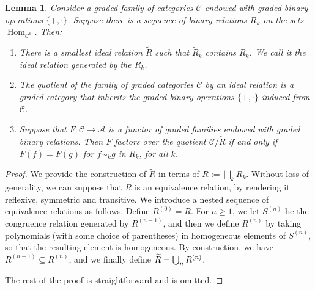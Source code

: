 \documentclass[11pt]{article}
\theoremstyle{plain}
\newtheorem{lemma}[theorem]{Lemma}
\theoremstyle{definition}
\newcommand{\Acal}{\mathcal A}
\newcommand{\Ccal}{\mathcal C}
\DeclareMathOperator{\Hom}{Hom}
\begin{document}
\begin{lemma}\label{lemma:ideal-relation}
Consider a graded family of categories $\Ccal$ endowed with graded binary operations $\{+, \cdot \}$. Suppose there is a sequence of binary relations $R_{k}$ on the sets $\Hom_{\Ccal^k}$. Then:
\begin{enumerate}
\item\label{lemma:ideal-relation-1} There is a smallest ideal relation $\widetilde{R}$ such that $\widetilde{R}_{k}$ contains $R_{k}$. We call it the ideal relation generated by the $R_k$.
\item\label{lemma:ideal-relation-2} The quotient of the family of graded categories $\Ccal$ by an ideal relation is a graded category that inherits the graded binary operations $\{+,\cdot \}$ induced from $\Ccal$.
\item\label{lemma:ideal-relation-3} Suppose that $F: \Ccal \to \Acal$ is a functor of graded families endowed with graded binary relations. Then $F$ factors over the quotient $\Ccal/\widetilde{R}$ if and only if $F(f)=F(g)$ for $f \sim_k g$ in $R_{k}$, for all $k$.
\end{enumerate}
\end{lemma}
\begin{proof}
We provide the construction of $\widetilde{R}$ in terms of $R:=\bigsqcup_{k}R_{k}$. Without loss of generality, we can suppose that $R$ is an equivalence relation, by rendering it reflexive, symmetric and transitive. We introduce a nested sequence of equivalence relations as follows. Define $R^{(0)}=R$. For $n\geq 1$, we let $S^{(n)}$ be the congruence relation generated by $R^{(n-1)}$, and then we define $R^{(n)}$ by taking polynomials (with some choice of parentheses) in homogeneous elements of $S^{(n)}$, so that the resulting element is homogeneous. By construction, we have $R^{(n-1)}\subseteq R^{(n)}$, and we finally define $\widetilde{R}=\nobreak\bigcup_{n}R^{(n)}$.

The rest of the proof is straightforward and is omitted.
\end{proof}
\end{document}
